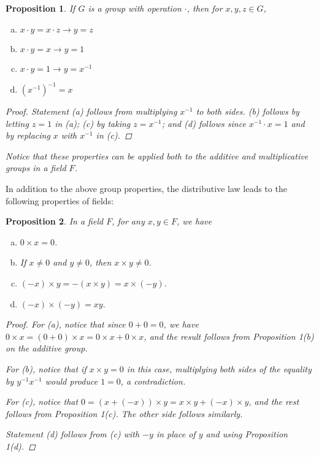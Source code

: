 \documentclass{scrbook}
\renewcommand{\implies}{\rightarrow}
\newtheorem{proposition}{Proposition}
\begin{document}
\begin{proposition}
If $G$ is a group with operation $\cdot$, then for $x, y, z \in G$,
\begin{enumerate}[(a)]
\item $x \cdot y = x \cdot z \implies y = z$
\item $x \cdot y = x \implies y = 1$
\item $x \cdot y = 1 \implies y = x^{-1}$
\item $(x^{-1})^{-1} = x$
\end{enumerate}
\begin{proof}
Statement (a) follows from multiplying $x^{-1}$ to both sides. (b) follows by letting $z = 1$ in (a); (c) by taking $z = x^{-1}$; and (d) follows since $x^{-1} \cdot x = 1$ and by replacing $x$ with $x^{-1}$ in (c). 
\end{proof}
Notice that these properties can be applied both to the additive and multiplicative groups in a field $F$. 
\end{proposition}

In addition to the above group properties, the distributive law leads to the following properties of fields:

\begin{proposition}
In a field $F$, for any $x, y \in F$, we have
\begin{enumerate}[(a)]
\item $0 \times x = 0$.
\item If $x \ne 0$ and $y \ne 0$, then $x \times y \ne 0$.
\item $(-x) \times y = - (x \times y) = x \times (-y)$.
\item $(-x) \times (-y) = xy$.
\end{enumerate}

\begin{proof}
For (a), notice that since $0 + 0 = 0$, we have $0 \times x = (0 + 0) \times x = 0 \times x + 0 \times x$, and the result follows from Proposition 1(b) on the additive group.

For (b), notice that if $x \times y = 0$ in this case, multiplying both sides of the equality by $y^{-1}x^{-1}$ would produce $1 = 0$, a contradiction.

For (c), notice that $0 = (x + (-x)) \times y = x \times y + (-x) \times y$, and the rest follows from Proposition 1(c). The other side follows similarly.

Statement (d) follows from (c) with $-y$ in place of $y$ and using Proposition 1(d). 
\end{proof}
\end{proposition}
\end{document}
